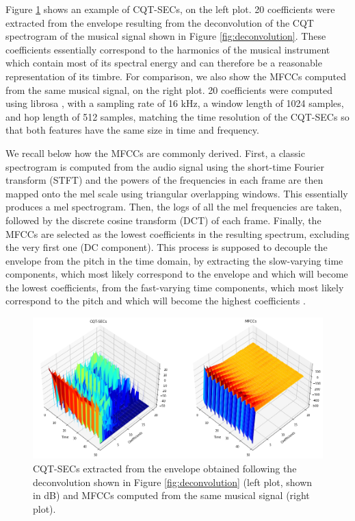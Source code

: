 \documentclass[journal]{IEEEtran}
\begin{document}
Figure \ref{fig:extraction} shows an example of CQT-SECs, on the left plot. 20 coefficients were extracted from the envelope resulting from the deconvolution of the CQT spectrogram of the musical signal shown in Figure \ref{fig:deconvolution}. These coefficients essentially correspond to the harmonics of the musical instrument which contain most of its spectral energy and can therefore be a reasonable representation of its timbre. For comparison, we also show the MFCCs computed from the same musical signal, on the right plot. 20 coefficients were computed using librosa \cite{mcfee2015}, with a sampling rate of 16 kHz, a window length of 1024 samples, and hop length of 512 samples, matching the time resolution of the CQT-SECs so that both features have the same size in time and frequency. 

We recall below how the MFCCs are commonly derived. First, a classic spectrogram is computed from the audio signal using the short-time Fourier transform (STFT) and the powers of the frequencies in each frame are then mapped onto the mel scale \cite{stevens1937} using triangular overlapping windows. This essentially produces a mel spectrogram. Then, the logs of all the mel frequencies are taken, followed by the discrete cosine transform (DCT) of each frame. Finally, the MFCCs are selected as the lowest coefficients in the resulting spectrum, excluding the very first one (DC component). This process is supposed to decouple the envelope from the pitch in the time domain, by extracting the slow-varying time components, which most likely correspond to the envelope and which will become the lowest coefficients, from the fast-varying time components, which most likely correspond to the pitch and which will become the highest coefficients \cite{mermelstein1976}. 

\begin{figure}[htp]
    \centering
    \includegraphics[width=\textwidth]{extraction.png}
    \caption{CQT-SECs extracted from the envelope obtained following the deconvolution shown in Figure \ref{fig:deconvolution} (left plot, shown in dB) and MFCCs computed from the same musical signal (right plot).}
    \label{fig:extraction}
\end{figure}
\end{document}
